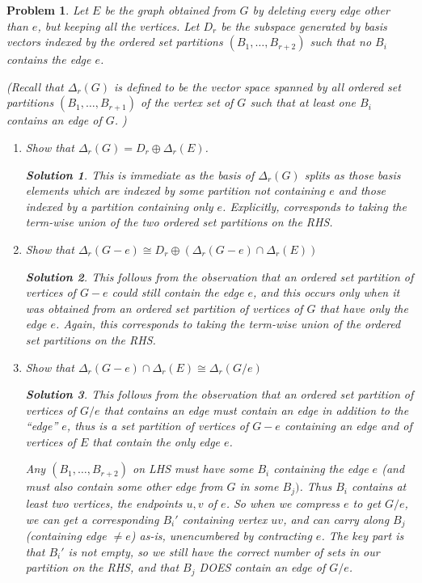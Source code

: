 \documentclass{article}
\theoremstyle{normal}
\newtheorem{problem}{Problem}
\theoremstyle{thmit}
\newtheorem*{solution}{Solution}
\begin{document}
\begin{problem} Let $E$ be the graph obtained from $G$ by deleting every edge other than $e$, but keeping all the vertices. Let $D_r$ be the subspace generated by basis vectors indexed by the ordered set partitions $(B_1,\dots,B_{r+2})$ such that no $B_i$ contains the edge $e$.

(Recall that $\Delta_r(G)$ is defined to be the vector space spanned by all ordered set partitions $(B_1, \dots, B_{r+1})$ of the vertex set of $G$ such that \emph{at least one} $B_i$ contains an edge of $G$. )

\begin{enumerate}
    \item[(a)] Show that $\Delta_r(G) = D_r \oplus \Delta_r(E)$.
    \begin{solution}
This is immediate as the basis of $\Delta_r(G)$ splits as those basis elements which are indexed by some partition not containing $e$ and those indexed by a partition containing only $e$. Explicitly, corresponds to taking the term-wise union of the two ordered set partitions on the RHS.
\end{solution}
    \item[(b)] Show that $\Delta_r(G-e)\cong D_r \oplus \left(\Delta_r(G-e)\cap \Delta_r(E) \right)$
    \begin{solution}
This follows from the observation that an ordered set partition of vertices of $G-e$ could still contain the edge $e$, and this occurs only when it was obtained from an ordered set partition of vertices of $G$ that have only the edge $e$. Again, this corresponds to taking the term-wise union of the ordered set partitions on the RHS.
\end{solution}
    \item[(c)] Show that $\Delta_r(G-e)\cap \Delta_r(E) \cong \Delta_r(G/e)$
    \begin{solution}
        This follows from the observation that an ordered set
        partition of vertices of $G/e$ that contains an edge must
        contain an edge in addition to the ``edge'' $e$, thus is a set
        partition of vertices of $G-e$ containing an edge and of
        vertices of $E$ that contain the only edge $e$.

Any $(B_1, \dots, B_{r+2})$ on LHS must have some $B_i$ containing the edge $e$ (and must also contain some other edge from $G$ in some $B_j)$. Thus $B_i$ contains at least two vertices, the endpoints $u,v$ of $e$. So when we compress $e$ to get $G/e$, we can get a corresponding $B_i'$ containing vertex $uv$, and can carry along $B_j$ (containing edge $\neq e$) as-is, unencumbered by contracting $e$. The key part is that $B_i'$ is not empty, so we still have the correct number of sets in our partition on the RHS, and that $B_j$ DOES contain an edge of $G/e$.


\end{solution}
\end{enumerate}
\end{problem}
\end{document}
